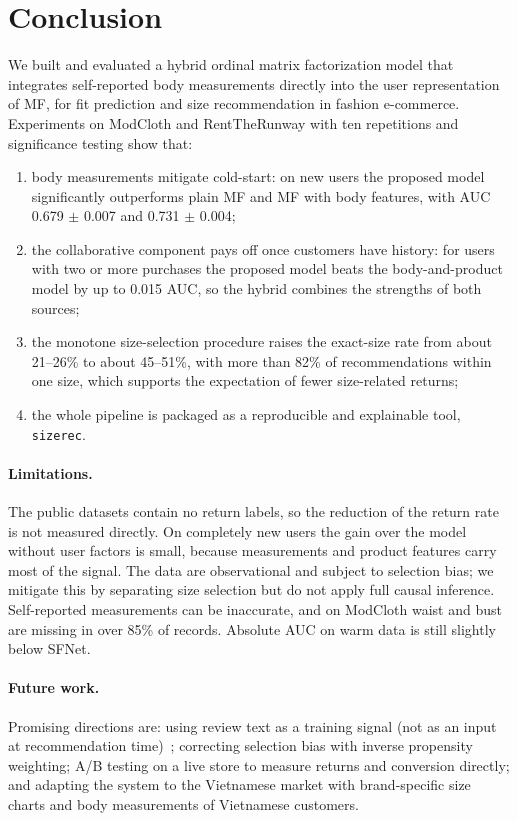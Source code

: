 \section{Conclusion}\label{sec8}

We built and evaluated a hybrid ordinal matrix factorization model that integrates self-reported body measurements directly into the user representation of MF, for fit prediction and size recommendation in fashion e-commerce. Experiments on ModCloth and RentTheRunway with ten repetitions and significance testing show that:
\begin{enumerate}
\item body measurements mitigate cold-start: on new users the proposed model significantly outperforms plain MF and MF with body features, with AUC 0.679 $\pm$ 0.007 and 0.731 $\pm$ 0.004;
\item the collaborative component pays off once customers have history: for users with two or more purchases the proposed model beats the body-and-product model by up to 0.015 AUC, so the hybrid combines the strengths of both sources;
\item the monotone size-selection procedure raises the exact-size rate from about 21--26\% to about 45--51\%, with more than 82\% of recommendations within one size, which supports the expectation of fewer size-related returns;
\item the whole pipeline is packaged as a reproducible and explainable tool, \texttt{sizerec}.
\end{enumerate}

\paragraph{Limitations.} The public datasets contain no return labels, so the reduction of the return rate is not measured directly. On completely new users the gain over the model without user factors is small, because measurements and product features carry most of the signal. The data are observational and subject to selection bias; we mitigate this by separating size selection but do not apply full causal inference. Self-reported measurements can be inaccurate, and on ModCloth waist and bust are missing in over 85\% of records. Absolute AUC on warm data is still slightly below SFNet.

\paragraph{Future work.} Promising directions are: using review text as a training signal (not as an input at recommendation time)~\cite{baier2019reviews,chatterjee2022reviews}; correcting selection bias with inverse propensity weighting; A/B testing on a live store to measure returns and conversion directly; and adapting the system to the Vietnamese market with brand-specific size charts and body measurements of Vietnamese customers.
